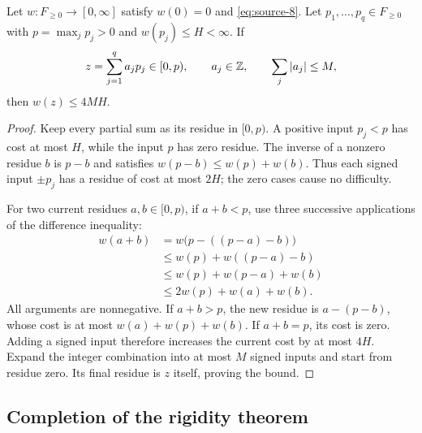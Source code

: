 \begin{lemma}\label{lem:rigidity-capped-residues}
Let $w:F_{\geq0}\to[0,\infty]$ satisfy $w(0)=0$ and
\eqref{eq:source-8}.  Let $p_1,\ldots,p_q\in F_{\geq0}$ with
$p=\max_jp_j>0$ and $w(p_j)\leq H<\infty$.  If
\[
 z=\sum_{j=1}^q a_jp_j\in[0,p),\qquad
 a_j\in\mathbb Z,\qquad\sum_j|a_j|\leq M,
\]
then $w(z)\leq4MH$.
\end{lemma}

\begin{proof}
Keep every partial sum as its residue in $[0,p)$.  A positive input
$p_j<p$ has cost at most $H$, while the input $p$ has zero residue.
The inverse of a nonzero residue $b$ is $p-b$ and satisfies
$w(p-b)\leq w(p)+w(b)$.  Thus each signed input $\pm p_j$ has a
residue of cost at most $2H$; the zero cases cause no difficulty.

For two current residues $a,b\in[0,p)$, if $a+b<p$, use three successive
applications of the difference inequality:
\begin{align*}
 w(a+b)
 &=w\bigl(p-((p-a)-b)\bigr)\\
 &\leq w(p)+w((p-a)-b)\\
 &\leq w(p)+w(p-a)+w(b)\\
 &\leq2w(p)+w(a)+w(b).
\end{align*}
All arguments are nonnegative.  If $a+b>p$, the new residue is
$a-(p-b)$, whose cost is at most $w(a)+w(p)+w(b)$.  If $a+b=p$, its
cost is zero.  Adding a signed input therefore increases the current
cost by at most $4H$.  Expand the integer combination into at most $M$
signed inputs and start from residue zero.  Its final residue is $z$
itself, proving the bound.
\end{proof}

\subsection{Completion of the rigidity theorem}

